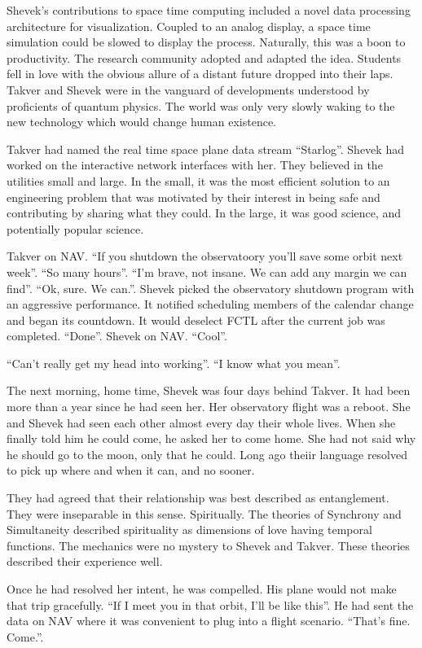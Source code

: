 Shevek's contributions to space time computing included a novel data
processing architecture for visualization.  Coupled to an analog
display, a space time simulation could be slowed to display the
process.  Naturally, this was a boon to productivity.  The research
community adopted and adapted the idea.  Students fell in love with
the obvious allure of a distant future dropped into their laps.
Takver and Shevek were in the vanguard of developments understood by
proficients of quantum physics.  The world was only very slowly waking
to the new technology which would change human existence.

Takver had named the real time space plane data stream ``Starlog''.
Shevek had worked on the interactive network interfaces with her.
They believed in the utilities small and large.  In the small, it was
the most efficient solution to an engineering problem that was
motivated by their interest in being safe and contributing by sharing
what they could.  In the large, it was good science, and potentially
popular science.

Takver on NAV.  ``If you shutdown the observatoory you'll save some
orbit next week''.  ``So many hours''.  ``I'm brave, not insane.  We
can add any margin we can find''.  ``Ok, sure.  We can.''.  Shevek
picked the observatory shutdown program with an aggressive
performance.  It notified scheduling members of the calendar change
and began its countdown.  It would deselect FCTL after the current job
was completed.  ``Done''.  Shevek on NAV.  ``Cool''.

``Can't really get my head into working''.  ``I know what you mean''.

The next morning, home time, Shevek was four days behind Takver.  It
had been more than a year since he had seen her.  Her observatory
flight was a reboot.  She and Shevek had seen each other almost every
day their whole lives.  When she finally told him he could come, he
asked her to come home.  She had not said why he should go to the
moon, only that he could.  Long ago theiir language resolved to pick
up where and when it can, and no sooner.

They had agreed that their relationship was best described as
entanglement.  They were inseparable in this sense.  Spiritually.  The
theories of Synchrony and Simultaneity described spirituality as
dimensions of love having temporal functions.  The mechanics were no
mystery to Shevek and Takver.  These theories described their
experience well.

Once he had resolved her intent, he was compelled.  His plane would
not make that trip gracefully.  ``If I meet you in that orbit, I'll be
like this''.  He had sent the data on NAV where it was convenient to
plug into a flight scenario.  ``That's fine.  Come.''.


